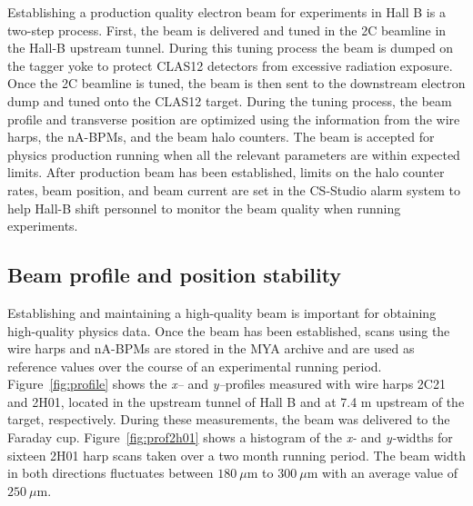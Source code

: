 


Establishing a production quality electron beam for experiments in Hall B is a two-step process. First, the beam is delivered and tuned in 
the 2C beamline in the Hall-B upstream tunnel. During this tuning process the beam is dumped on the tagger yoke to protect CLAS12 
detectors from excessive radiation exposure. Once the 2C beamline is tuned, the beam is then sent to the downstream electron dump and 
tuned onto the CLAS12 target. During the tuning process, the beam profile and transverse position are optimized using the information from 
the wire harps, the nA-BPMs, and the beam halo counters.  The beam is accepted for physics production running when all the relevant 
parameters are within expected limits. After production beam has been established,  limits on the halo counter rates, beam position, and 
beam current are set in the CS-Studio alarm system to help Hall-B shift personnel to monitor the beam quality when running experiments.  







\subsection{Beam profile and position stability}

Establishing and maintaining a high-quality beam is important for obtaining high-quality physics data. Once the beam has been established, 
scans using the wire harps and nA-BPMs are stored in the MYA archive and are used as reference values over the course of an experimental
running period. Figure~\ref{fig:profile}  shows the {\it x--} and {\it y--}profiles measured with wire harps 2C21 and 2H01, located in the upstream 
tunnel of Hall B and at 7.4 m upstream of the target, respectively. During these measurements, the beam was delivered to the Faraday cup.
Figure~\ref{fig:prof2h01} shows a histogram of the {\it x-} and {\it y-}widths for sixteen 2H01 harp scans taken over a two month running
period.  The beam width in both directions fluctuates between $180~\mu$m to $300~\mu$m with an average value of $250~\mu$m. 

